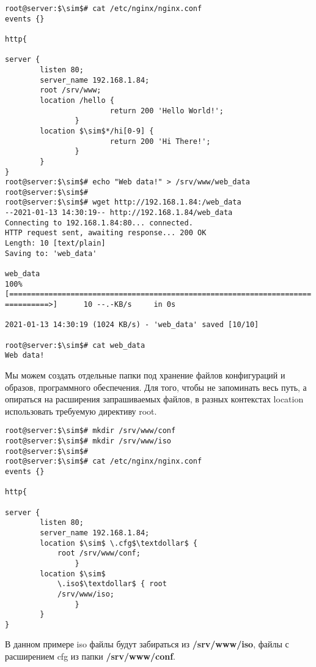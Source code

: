 \documentclass[14pt, a4paper]{article}
\begin{document}
\vspace{0.3cm}
\begin{lstlisting}
root@server:$\sim$# cat /etc/nginx/nginx.conf
events {}

http{ 
    
server {
        listen 80;
        server_name 192.168.1.84;
        root /srv/www;
        location /hello {
                        return 200 'Hello World!';
                }
        location $\sim$*/hi[0-9] {
                        return 200 'Hi There!';
                }
        }
}
root@server:$\sim$# echo "Web data!" > /srv/www/web_data
root@server:$\sim$#
root@server:$\sim$# wget http://192.168.1.84:/web_data
--2021-01-13 14:30:19-- http://192.168.1.84/web_data
Connecting to 192.168.1.84:80... connected.
HTTP request sent, awaiting response... 200 OK
Length: 10 [text/plain]
Saving to: 'web_data'

web_data
100%[=====================================================================
==========>]      10 --.-KB/s     in 0s

2021-01-13 14:30:19 (1024 KB/s) - 'web_data' saved [10/10]

root@server:$\sim$# cat web_data
Web data!
\end{lstlisting}
\newpage

Мы можем создать отдельные папки под хранение файлов конфигураций и образов, программного
обеспечения. Для того, чтобы не запоминать весь путь, а опираться на расширения запрашиваемых
файлов, в разных контекстах \colorbox{backcolour}{location} использовать требуемую директиву \colorbox{backcolour}{root}.

\vspace{0.3cm}
\begin{lstlisting}
root@server:$\sim$# mkdir /srv/www/conf
root@server:$\sim$# mkdir /srv/www/iso
root@server:$\sim$#
root@server:$\sim$# cat /etc/nginx/nginx.conf
events {}

http{ 
    
server {
        listen 80;
        server_name 192.168.1.84;
        location $\sim$ \.cfg$\textdollar$ {
            root /srv/www/conf;
                }
        location $\sim$
            \.iso$\textdollar$ { root
            /srv/www/iso;
                }
        }
}
\end{lstlisting}
\vspace{0.2cm}

В данном примере iso файлы будут забираться из \textbf{/srv/www/iso}, файлы с расширением cfg из папки
\textbf{/srv/www/conf}.
\end{document}
